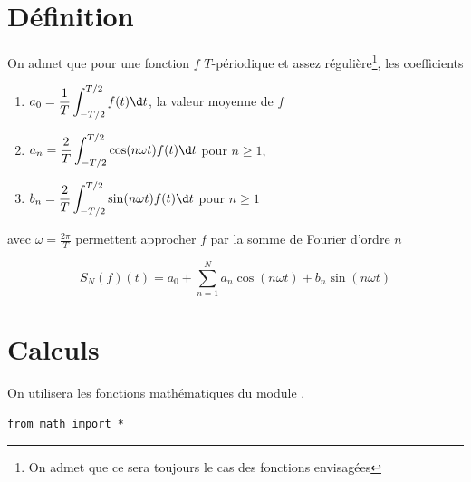 \section{Définition}
On admet que pour une fonction $f$ $T$-périodique et assez régulière\footnote{On admet que ce sera toujours le cas des fonctions envisagées}, les coefficients 
\begin{enumerate}
    \item $\displaystyle a_0 = \frac 1T\int_{-T/2}^{T/2}f(t)\d t$, la valeur moyenne de $f$
    \item $\displaystyle a_n = \frac 2T\int_{-T/2}^{T/2}\cos(n\omega t)f(t)\d t$  pour $n\ge 1$,     
    \item $\displaystyle b_n = \frac 2T\int_{-T/2}^{T/2}\sin(n\omega t)f(t)\d t$ pour $n\ge 1$
\end{enumerate}
avec $\displaystyle \omega = \frac{2\pi}T$ permettent approcher $f$ par la somme de Fourier d'ordre $n$

\[S_N(f)(t) =   a_0 + \sum_{n=1}^{N} a_n\cos(n\omega t) + b_n\sin(n\omega t)\]
\section{Calculs}
On utilisera les fonctions mathématiques du module .
\begin{lstlisting}
from math import *
\end{lstlisting}
